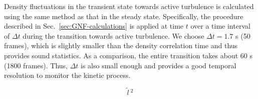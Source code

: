 \documentclass[twocolumn,aps,prx,amsmath,amssymb,longbibliography]{revtex4-2}
\begin{document}
Density fluctuations in the transient state towards active turbulence is calculated using the same method as that in the steady state. Specifically, the procedure described in Sec.~\ref{sec:GNF-calculations} is applied at time $t$ over a time interval of $\Delta t$ during the transition towards active turbulence. We choose $\Delta t = 1.7$ s (50 frames), which is slightly smaller than the density correlation time and thus provides sound statistics. As a comparison, the entire transition takes about 60 s (1800 frames). Thus, $\Delta t$ is also small enough and provides a good temporal resolution to monitor the kinetic process.

$$
{\widetilde{l}}\:^2
$$





\end{document}
